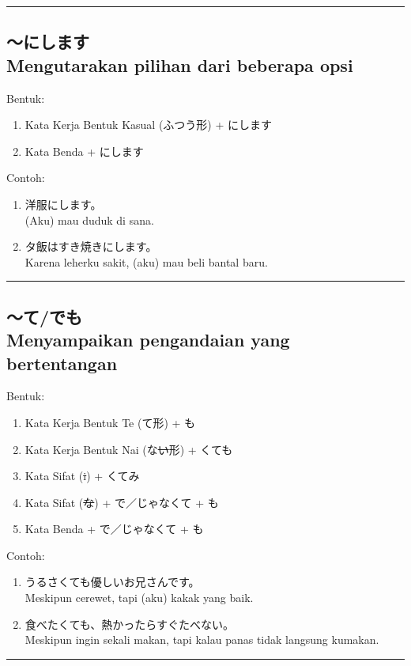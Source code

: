 \vspace{0.2cm}\hrule height 1pt\vspace{0.2cm}


\subsection*{
    ～にします \\
    Mengutarakan pilihan dari beberapa opsi
}
Bentuk:
\begin{enumerate}
    \item Kata Kerja Bentuk Kasual (ふつう形) + にします
    \item Kata Benda + にします
\end{enumerate}
Contoh: 
\begin{enumerate}
    \item 洋服にします。
    \\ (Aku) mau duduk di sana.
    \item タ飯はすき焼きにします。
    \\ Karena leherku sakit, (aku) mau beli bantal baru.
\end{enumerate}

\vspace{0.2cm}\hrule height 1pt\vspace{0.2cm}

\newpage
\subsection*{
    ～て/でも \\
    Menyampaikan pengandaian yang bertentangan
}
Bentuk:
\begin{enumerate}
    \item Kata Kerja Bentuk Te (て形) + も
    \item Kata Kerja Bentuk Nai (な\sout{い}形) + くても
    \item Kata Sifat (\sout{i}) + くてみ
    \item Kata Sifat (\sout{な}) + で／じゃなくて + も
    \item Kata Benda + で／じゃなくて + も
\end{enumerate}
Contoh: 
\begin{enumerate}
    \item うるさくても優しいお兄さんです。
    \\ Meskipun cerewet, tapi (aku) kakak yang baik.
    \item 食べたくても、熱かったらすぐたべない。
    \\ Meskipun ingin sekali makan, tapi kalau panas tidak langsung kumakan.
\end{enumerate}

\vspace{0.2cm}\hrule height 1pt\vspace{0.2cm}
